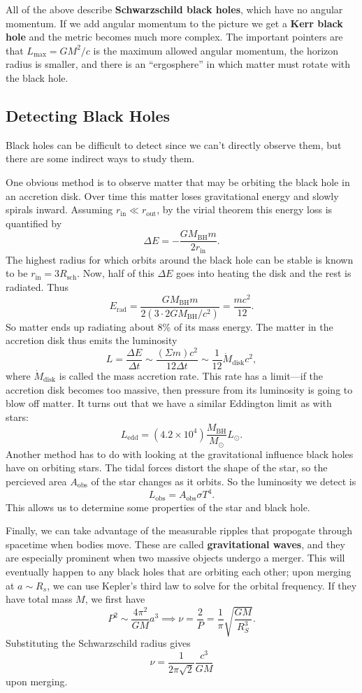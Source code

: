 \documentclass[../a062main.tex]{subfiles}
\begin{document}
All of the above describe \textbf{Schwarzschild black holes}, which have no angular momentum.
If we add angular momentum to the picture we get a \textbf{Kerr black hole} and the metric becomes much more complex.
The important pointers are that $L_\textrm{max} = GM^2 / c$ is the maximum allowed angular momentum, the horizon radius is smaller, and there is an ``ergosphere'' in which matter must rotate with the black hole.

\subsection*{Detecting Black Holes}
Black holes can be difficult to detect since we can't directly observe them, but there are some indirect ways to study them.

One obvious method is to observe matter that may be orbiting the black hole in an accretion disk.
Over time this matter loses gravitational energy and slowly spirals inward.
Assuming $r_\textrm{in} \ll r_\textrm{out}$, by the virial theorem this energy loss is quantified by
\[ \Delta E = -\frac{GM_\textrm{BH}m}{2r_\textrm{in}}. \]
The highest radius for which orbits around the black hole can be stable is known to be $r_\textrm{in} = 3R_\textrm{sch}$.
Now, half of this $\Delta E$ goes into heating the disk and the rest is radiated.
Thus
\[ E_\textrm{rad} = \frac{GM_\textrm{BH}m}{2 (3 \cdot 2GM_\textrm{BH} / c^2)} = \frac{mc^2}{12}. \]
So matter ends up radiating about 8\% of its mass energy.
The matter in the accretion disk thus emits the luminosity
\[ L = \frac{\Delta E}{\Delta t} \sim \frac{(\Sigma m) c^2}{12 \Delta t} \sim \frac{1}{12} \dot M_\textrm{disk} c^2, \]
where $\dot M_\textrm{disk}$ is called the mass accretion rate.
This rate has a limit---if the accretion disk becomes too massive, then pressure from its luminosity is going to blow off matter.
It turns out that we have a similar Eddington limit as with stars:
\[ L_\textrm{edd} = (4.2 \times 10^{4}) \frac{M_\textrm{BH}}{M_\odot} L_\odot. \]
Another method has to do with looking at the gravitational influence black holes have on orbiting stars.
The tidal forces distort the shape of the star, so the percieved area $A_\textrm{obs}$ of the star changes as it orbits.
So the luminosity we detect is
\[ L_\textrm{obs} = A_\textrm{obs} \sigma T^{4}. \]
This allows us to determine some properties of the star and black hole.

Finally, we can take advantage of the measurable ripples that propogate through spacetime when bodies move.
These are called \textbf{gravitational waves}, and they are especially prominent when two massive objects undergo a merger.
This will eventually happen to any black holes that are orbiting each other; upon merging at $a \sim R_s$, we can use Kepler's third law to solve for the orbital frequency.
If they have total mass $M$, we first have
\[ P^2 \sim \frac{4\pi^2}{GM} a^3 \implies \nu = \frac{2}{P} = \frac{1}{\pi} \sqrt{\frac{GM}{R_S^3}}. \]
Substituting the Schwarzschild radius gives
\[ \nu = \frac{1}{2\pi \sqrt{2}} \frac{c^3}{GM} \]
upon merging.

\end{document}
